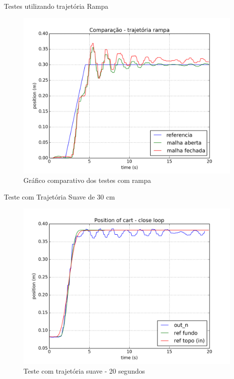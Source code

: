 \documentclass[10pt]{beamer}
\begin{document}
\begin{frame}[fragile]{Testes utilizando trajetória Rampa}
\begin{figure}[!ht]
\centering
\includegraphics[width=.8\linewidth]{figures/resultados/experimento/rampa_comp}
\caption{Gráfico comparativo dos testes com rampa}
\label{rampaComp}
\end{figure}
\end{frame}

\begin{frame}[fragile]{Teste com Trajetória Suave de 30 cm}
\begin{figure}[!ht]
\centering
\includegraphics[width=.8\linewidth]{figures/resultados/experimento/closed_loop_trajetoria_rafael}
\caption{Teste com trajetória suave - 20 segundos}
\label{trajSuave20}
\end{figure}
\end{frame}
\end{document}
